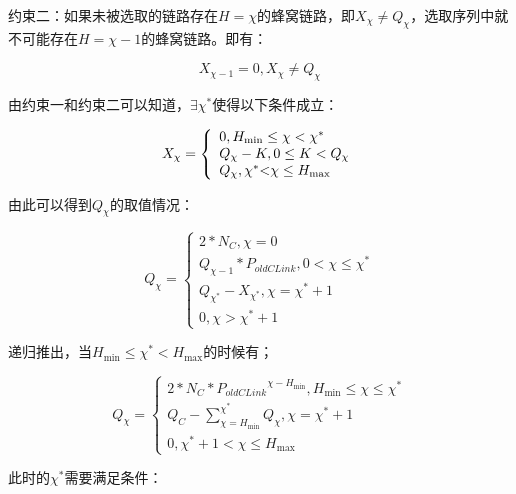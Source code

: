 \documentclass[figurelist,tablelist,algorithmlist,nomlist,masters]{seuthesix}
\begin{document}
	约束二：如果未被选取的链路存在$H = \chi $的蜂窝链路，即$X_{\chi } \ne Q_{\chi }$，选取序列中就不可能存在$H = \chi - 1$的蜂窝链路。即有：

	\begin{equation}\label{eq3.1}
	X_{\chi  - 1} = 0,X_{\chi } \ne Q_{\chi }
	\end{equation}

	由约束一和约束二可以知道，$\exists \chi ^*$使得以下条件成立：


	\begin{equation}\label{eq3.1}
	{X_\chi } = \left\{ \begin{array}{l}
	0,{H_{\min }} \le \chi  < {\chi ^*}\\
	{Q_\chi } - K,0 \le K < {Q_\chi }\\
	{Q_\chi },{\chi ^*}{\rm{ <  }}\chi  \le {H_{\max }}
	\end{array} \right.
	\end{equation}

	由此可以得到$Q_{\chi}$的取值情况：

	\begin{equation}\label{eq3.1}
	Q_{\chi } = \left\{ \begin{array}{l}
	2*N_C,\chi = 0\\
	Q_{\chi - 1}*{P_{oldCLink}},0 < \chi  \le \chi ^*\\
	Q_{\chi ^*} - X_{\chi ^*},\chi  = \chi ^* + 1\\
	0,\chi  > \chi ^* + 1
	\end{array} \right.
	\end{equation}

	递归推出，当$H_{\min } \le \chi ^* < H_{\max }$的时候有；

	\begin{equation}\label{eq3.1}
	Q_\chi  = \left\{ \begin{array}{l}
	2*N_C*{P_{oldCLink}}^{\chi - H_{\min }},H_{\min } \le \chi  \le \chi ^*\\
	Q_C - \sum\limits_{\chi = H_{\min }}^{\chi ^*} {Q_{\chi }} ,\chi  = {\chi ^* + 1}\\
	0,\chi ^* + 1 < \chi  \le {H_{\max }}
	\end{array} \right.
	\end{equation}

	此时的$\chi ^*$需要满足条件：
\end{document}
